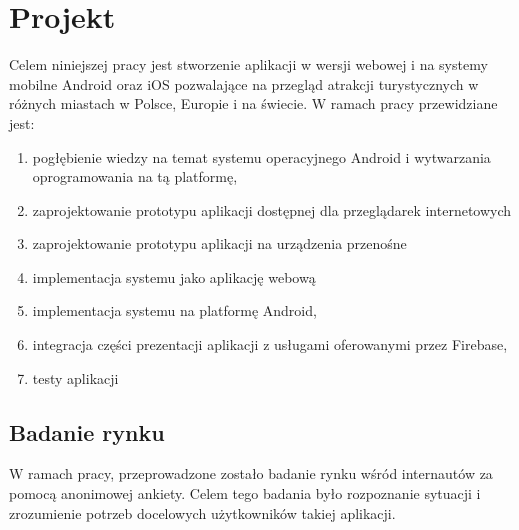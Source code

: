 \newpage
\section{Projekt}
Celem niniejszej pracy jest stworzenie aplikacji w wersji webowej i na systemy mobilne Android oraz iOS pozwalające na przegląd atrakcji turystycznych w różnych miastach w Polsce, Europie i na świecie. W ramach pracy przewidziane jest:
\begin{enumerate}
    \item pogłębienie wiedzy na temat systemu operacyjnego Android i wytwarzania oprogramowania na tą platformę,
    \item zaprojektowanie prototypu aplikacji dostępnej dla przeglądarek internetowych
    \item zaprojektowanie prototypu aplikacji na urządzenia przenośne
    \item implementacja systemu jako aplikację webową
    \item implementacja systemu na platformę Android,
    \item integracja części prezentacji aplikacji z usługami oferowanymi przez Firebase,
    \item testy aplikacji
\end{enumerate}

    \subsection{Badanie rynku}
    W ramach pracy, przeprowadzone zostało badanie rynku wśród internautów za pomocą anonimowej ankiety. Celem tego badania było rozpoznanie sytuacji i zrozumienie potrzeb docelowych użytkowników takiej aplikacji.

